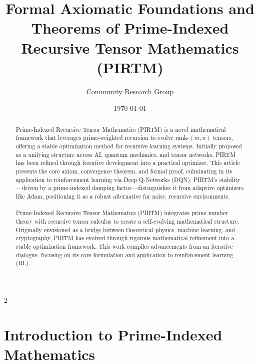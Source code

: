 \documentclass{article}
\theoremstyle{plain}
\begin{document}
\title{Formal Axiomatic Foundations and Theorems of Prime-Indexed Recursive Tensor Mathematics (PIRTM)}

\author{Community Research Group}
\date{\today}

\maketitle

\begin{abstract}
Prime-Indexed Recursive Tensor Mathematics (PIRTM) is a novel mathematical framework that leverages prime-weighted recursion to evolve rank-$(m,n)$ tensors, offering a stable optimization method for recursive learning systems. Initially proposed as a unifying structure across AI, quantum mechanics, and tensor networks, PIRTM has been refined through iterative development into a practical optimizer. This article presents the core axiom, convergence theorem, and formal proof, culminating in its application to reinforcement learning via Deep Q-Networks (DQN). PIRTM’s stability—driven by a prime-indexed damping factor—distinguishes it from adaptive optimizers like Adam, positioning it as a robust alternative for noisy, recursive environments.

\paragraph{}Prime-Indexed Recursive Tensor Mathematics (PIRTM) integrates prime number theory with recursive tensor calculus to create a self-evolving mathematical structure. Originally envisioned as a bridge between theoretical physics, machine learning, and cryptography, PIRTM has evolved through rigorous mathematical refinement into a stable optimization framework. This work compiles advancements from an iterative dialogue, focusing on its core formulation and application to reinforcement learning (RL).
\end{abstract}

\newpage
 \begin{multicols}{2}
\begin{singlespace}
\tableofcontents
\end{singlespace}
\end{multicols}

\section{Introduction to Prime-Indexed Mathematics}
\end{document}
